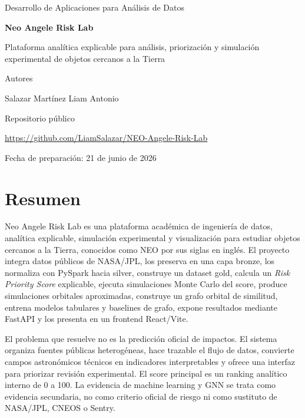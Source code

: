 \documentclass[12pt,a4paper]{report}
\begin{document}
\begin{titlepage}
\centering
{\Large Desarrollo de Aplicaciones para Análisis de Datos\par}
\vspace{2.2cm}
{\Huge\bfseries Neo Angele Risk Lab\par}
\vspace{0.4cm}
{\Large Plataforma analítica explicable para análisis, priorización y simulación experimental de objetos cercanos a la Tierra\par}
\vspace{2.2cm}
{\large Autores\par}
{\Large Salazar Martínez Liam Antonio\par}
\vfill
{\large Repositorio público\par}
\url{https://github.com/LiamSalazar/NEO-Angele-Risk-Lab}\par
\vspace{1cm}
{\large Fecha de preparación: 21 de junio de 2026\par}
\end{titlepage}

\tableofcontents
\clearpage

\chapter{Resumen}

Neo Angele Risk Lab es una plataforma académica de ingeniería de datos, analítica explicable, simulación experimental y visualización para estudiar objetos cercanos a la Tierra, conocidos como NEO por sus siglas en inglés. El proyecto integra datos públicos de NASA/JPL, los preserva en una capa bronze, los normaliza con PySpark hacia silver, construye un dataset gold, calcula un \emph{Risk Priority Score} explicable, ejecuta simulaciones Monte Carlo del score, produce simulaciones orbitales aproximadas, construye un grafo orbital de similitud, entrena modelos tabulares y baselines de grafo, expone resultados mediante FastAPI y los presenta en un frontend React/Vite.

El problema que resuelve no es la predicción oficial de impactos. El sistema organiza fuentes públicas heterogéneas, hace trazable el flujo de datos, convierte campos astronómicos técnicos en indicadores interpretables y ofrece una interfaz para priorizar revisión experimental. El score principal es un ranking analítico interno de 0 a 100. La evidencia de machine learning y GNN se trata como evidencia secundaria, no como criterio oficial de riesgo ni como sustituto de NASA/JPL, CNEOS o Sentry.
\end{document}
